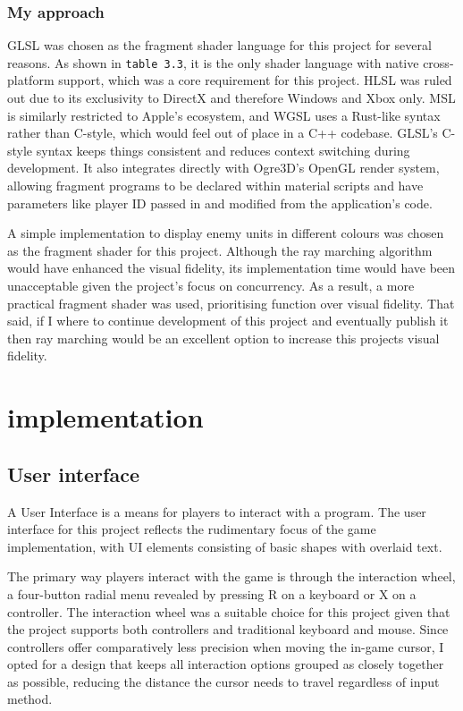 \documentclass[]{final_report}
\begin{document}
\subsection{My approach}

GLSL was chosen as the fragment shader language for this project for several reasons. As shown in \texttt{table 3.3}, it is the only shader language with native cross-platform support, which was a core requirement for this project. HLSL was ruled out due to its exclusivity to DirectX and therefore Windows and Xbox only. MSL is similarly restricted to Apple's ecosystem, and WGSL uses a Rust-like syntax rather than C-style, which would feel out of place in a C++ codebase. GLSL's C-style syntax keeps things consistent and reduces context switching during development. It also integrates directly with Ogre3D's OpenGL render system, allowing fragment programs to be declared within material scripts and have parameters like player ID passed in and modified from the application's code.

A simple implementation to display enemy units in different colours was chosen as the fragment shader for this project. Although the ray marching algorithm would have enhanced the visual fidelity, its implementation time would have been unacceptable given the project's focus on concurrency. As a result, a more practical fragment shader was used, prioritising function over visual fidelity.
That said, if I where to continue development of this project and eventually publish it then ray marching would be an excellent option to increase this projects visual fidelity.



\chapter{implementation}
\section{User interface}
A User Interface is a means for players to interact with a program. The user interface for this project reflects the rudimentary focus of the game implementation, with UI elements consisting of basic shapes with overlaid text.

The primary way players interact with the game is through the interaction wheel, a four-button radial menu revealed by pressing R on a keyboard or X on a controller. The interaction wheel was a suitable choice for this project given that the project supports both controllers and traditional keyboard and mouse. Since controllers offer comparatively less precision when moving the in-game cursor, I opted for a design that keeps all interaction options grouped as closely together as possible, reducing the distance the cursor needs to travel regardless of input method.
\end{document}
